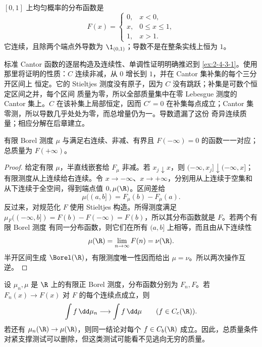 \begin{example}[均匀分布]\label{ex:2-3-3-2}
$[0,1]$ 上均匀概率的分布函数是
\[
 F(x)=\begin{cases}0,&x<0,\\x,&0\le x\le1,\\1,&x>1.
 \end{cases}
\]
它连续，且除两个端点外导数为 $\1_{(0,1)}$；导数不是在整条实线上恒为 $1$。
\end{example}

\begin{example}[Cantor 分布]\label{ex:2-3-3-3}
标准 Cantor 函数的逐层构造及连续性、单调性证明明确推迟到
\cref{ex:2-4-3-1}。使用那里将证明的性质：$C$ 连续非减，从 $0$ 增长到 $1$，并在 Cantor 集补集的每个三分开区间上
恒定。它的 Stieltjes 测度没有原子，因为 $C$ 没有跳跃；补集是可数个恒定区间之并，每个区间
质量为零，所以全部质量集中在零 Lebesgue 测度的 Cantor 集上。$C$ 在该补集上局部恒定，因而
$C'=0$ 在补集每点成立；Cantor 集零测，所以导数几乎处处为零，而总增量仍为一。导数遗漏了这份
奇异连续质量；相应分解在后章建立。
\end{example}

\begin{theorem}[测度—分布函数对应]\label{theorem:2-3-3-3}
有限 Borel 测度 $\mu$ 与满足右连续、非减、有界且 $F(-\infty)=0$ 的函数一一对应；总质量为
$F(+\infty)$。
\end{theorem}

\begin{proof}
给定有限 $\mu$，半直线嵌套给 $F_\mu$ 非减。若 $x_j\downarrow x$，则
$(-\infty,x_j]\downarrow(-\infty,x]$；有限测度从上连续给右连续。令
$x\to-\infty$、$x\to+\infty$，分别用从上连续于空集和从下连续于全空间，得到端点值
$0,\mu(\R)$。区间差给
\[
 \mu((a,b])=F_\mu(b)-F_\mu(a).
\]
反过来，对规范化 $F$ 使用 Stieltjes 构造。所得测度满足
$\mu_F(( -\infty,b])=F(b)-F(-\infty)=F(b)$，所以其分布函数就是 $F$。若两个有限 Borel 测度
有同一分布函数，则它们在所有 $(a,b]$ 上相等，而且由从下连续性
\[
 \mu(\R)=\lim_{n\to\infty}F(n)=\nu(\R).
\]
半开区间生成 $\Borel(\R)$，有限测度唯一性因而给出 $\mu=\nu$。所以两次操作互逆。
\end{proof}

\begin{proposition}[连续点上的分布函数收敛]\label{proposition:2-3-3-4}
设 $\mu_n,\mu$ 是 $\R$ 上的有限正 Borel 测度，分布函数分别为 $F_n,F$。若
$F_n(x)\to F(x)$ 对 $F$ 的每个连续点成立，则
\[
 \int f\,\dd\mu_n\longrightarrow\int f\,\dd\mu
 \qquad(f\in C_c(\R)).
\]
若还有 $\mu_n(\R)\to\mu(\R)$，则同一结论对每个 $f\in C_b(\R)$ 成立。因此，总质量条件
对紧支撑测试可以删除，但这类测试可能看不见逃向无穷的质量。
\end{proposition}

